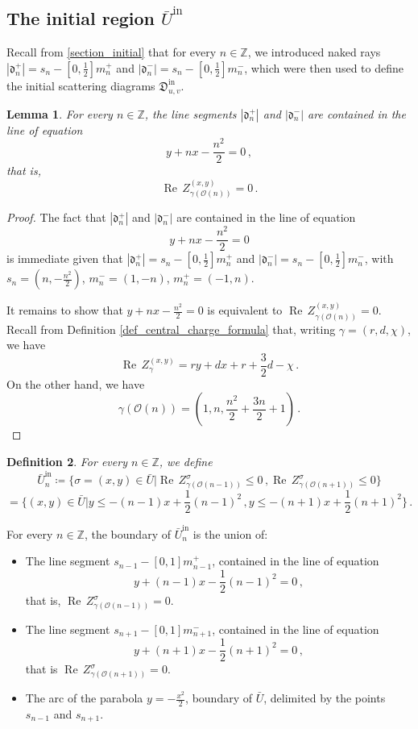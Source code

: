 \documentclass[12pt, a4paper]{amsart}
\newtheorem{defn}{Definition}[section]
\newtheorem{lem}[defn]{Lemma}
\newcommand\Z{\mathbb Z}
\newcommand\cO{\mathcal O}
\newcommand\fd{\mathfrak d}
\newcommand\fD{\mathfrak D}
\newcommand\Rea{\operatorname{Re}\,}
\newcommand\iin{\mathrm{in}}
\begin{document}
\subsection{The initial region $\bar{U}^\iin$}
\label{section_initial_region}

Recall from \cref{section_initial} that for every 
$n \in \Z$, we introduced naked rays 
$|\fd_n^+|=s_n-[0,\frac{1}{2}] m_n^+$ and 
$|\fd_n^-|=s_n-[0,\frac{1}{2}] m_n^-$,
which were then used to define the initial scattering diagrams
$\fD_{u,v}^\iin$. 



\begin{lem}
For every $n \in \Z$, the line segments 
$|\fd_n^+|$ and $|\fd_n^-|$ are contained 
in the line of equation
\[ y+nx-\frac{n^2}{2}=0\,,\]
that is,
\[ \Rea Z_{\gamma(\cO(n))}^{(x,y)}=0\,.\]
\end{lem}

\begin{proof}
The fact that $|\fd_n^+|$ and $|\fd_n^-|$ are contained 
in the line of equation
\[ y+nx-\frac{n^2}{2}=0\]
is immediate given that $|\fd_n^+|=s_n-[0,\frac{1}{2}] m_n^+$ and 
$|\fd_n^-|=s_n-[0,\frac{1}{2}] m_n^-$, with
$s_n = (n,-\frac{n^2}{2})$, 
$m_n^{-} =(1,-n)$,
$m_n^{+}=(-1,n)$.

It remains to show that $y+nx-\frac{n^2}{2}=0$ is equivalent to $\Rea Z_{\gamma(\cO(n))}^{(x,y)}=0$. Recall
from Definition
\ref{def_central_charge_formula} that, writing $\gamma=(r,d,\chi)$, we have 
\[ \Rea Z_\gamma^{(x,y)}=ry+dx+r+\frac{3}{2}d-\chi\,.\]
On the other hand, we have 
\[ \gamma(\cO(n))
=(1,n,\frac{n^2}{2}+\frac{3n}{2}+1)\,.\]
 
\end{proof}

\begin{defn}\label{def_initial_region}
For every $n \in \Z$, we define 
\[ \bar{U}_n^\iin
\coloneq \{ \sigma=(x,y) \in \bar{U} |
\Rea Z_{\gamma(\cO(n-1))}^\sigma \leqslant 0 \,,
\Rea Z_{\gamma(\cO(n+1))}^\sigma \leqslant 0\}\]
\[ =\{(x,y) \in \bar{U}| y\leqslant -(n-1)x+\frac{1}{2}(n-1)^2\,, y\leqslant -(n+1)x+\frac{1}{2}(n+1)^2\}\,.\]
\end{defn}

For every $n \in \Z$, the boundary of 
$\bar{U}_n^\iin$ is the union of:
\begin{itemize}
\item[(i)] The line segment $s_{n-1}-[0,1]m_{n-1}^+$, contained in the line of equation 
\[y+(n-1)x-\frac{1}{2}(n-1)^2=0\,,\] 
that is, $\Rea Z_{\gamma(\cO(n-1))}^\sigma=0$.
\item[(ii)] The line segment 
$s_{n+1}-[0,1]m_{n+1}^-$, contained in the line of equation \[y+(n+1)x-\frac{1}{2}(n+1)^2=0\,,\]
that is $\Rea Z_{\gamma(\cO(n+1))}^\sigma=0$.
\item[(iii)] The arc of the parabola 
$y=-\frac{x^2}{2}$, boundary of 
$\bar{U}$, delimited by the points $s_{n-1}$ and $s_{n+1}$.
\end{itemize}
\end{document}
